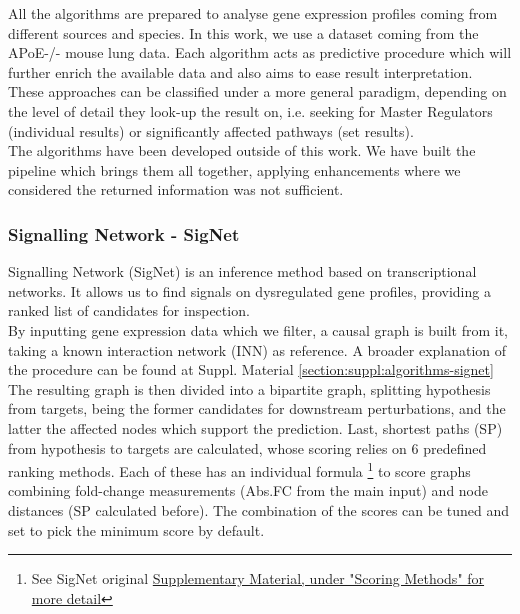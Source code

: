 All the algorithms are prepared to analyse gene expression profiles coming from different sources and species. In this work, we use a dataset coming from the APoE-/- \cite{LoSasso2016TheReduction} mouse lung data. Each algorithm acts as predictive procedure which will further enrich the available data and also aims to ease result interpretation. These approaches can be classified under a more general paradigm, depending on the  level of detail they look-up the result on, i.e. seeking for Master Regulators (individual results) or significantly affected pathways \cite{Faust2010PathwayExtraction} (set results).
\\

The algorithms have been developed outside of this work. We have built the pipeline which brings them all together, applying enhancements where we considered the returned information was not sufficient.
\\

\subsubsection{Signalling Network - SigNet}
\label{back:section:signet}
Signalling Network (SigNet) \cite{Jaeger2014CausalCancer} is an inference method based on transcriptional networks. It allows us to find signals on dysregulated gene profiles, providing a ranked list of candidates for inspection. 
\\

By inputting gene expression data which we filter, a causal graph is built from it, taking a known interaction network (INN) as reference. A broader explanation of the procedure can be found at Suppl. Material \ref{section:suppl:algorithms-signet}
\\

The resulting graph is then divided into a bipartite graph, splitting hypothesis from targets, being the former candidates for downstream perturbations, and the latter the affected nodes which support the prediction. Last, shortest paths (SP) from hypothesis to targets are calculated, whose scoring relies on 6 predefined ranking methods. Each of these has an individual formula \footnote{See SigNet original \href{https://journals.sagepub.com/doi/suppl/10.1177/1087057114522690/suppl_file/10.1177_1087057114522690.pdf}{Supplementary Material, under "Scoring Methods" for more detail}} to score graphs combining fold-change measurements (Abs.FC from the main input) and node distances (SP calculated before). The combination of the scores can be tuned and set to pick the minimum score by default.


